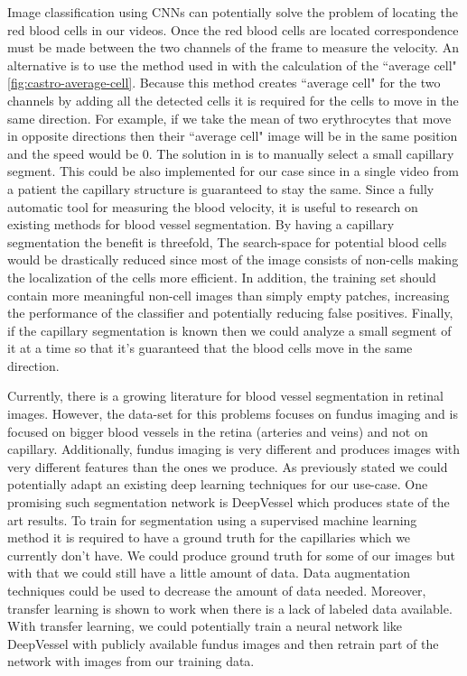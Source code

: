 \documentclass[]{article}
\begin{document}
Image classification using CNNs can potentially solve the problem of locating the red blood cells in our videos.
Once the red blood cells are located correspondence must be made between the two channels of the frame to measure the velocity.
An alternative is to use the method used in\cite{castro_rapid_2016} with the calculation 
of the ``average cell"\ref{fig:castro-average-cell}.
Because this method creates ``average cell" for the two channels by adding all the detected
cells it is required for the cells to move in the same direction. 
For example, if we take the mean of two erythrocytes that move in opposite directions then their ``average cell" image will be in the same position and the speed would be 0.
The solution in\cite{castro_rapid_2016} is to manually select a small capillary segment.
This could be also implemented for our case since in a single video from a patient 
the capillary structure is guaranteed to stay the same.
Since a fully automatic tool for measuring the blood velocity, it is useful
to research on existing methods for blood vessel segmentation.
By having a capillary segmentation the benefit is threefold,
The search-space for potential blood cells would be drastically reduced since
most of the image consists of non-cells making the localization of the cells more efficient.
In addition, the training set should contain more meaningful non-cell images than simply empty patches, increasing the performance of the classifier and potentially reducing false positives.
Finally, if the capillary segmentation is known then we could analyze a
small segment of it at a time so that it's guaranteed that the blood cells move 
in the same direction.

Currently, there is a growing literature for blood vessel segmentation 
in retinal images\cite{liskowski_segmenting_2016}\cite{fu_retinal_2016}\cite{li_cross-modality_2016}. 
However, the data-set for this problems focuses on fundus imaging\cite{fraz_blood_2012} and is focused on bigger blood vessels in the 
retina (arteries and veins) and not on capillary. 
Additionally, fundus imaging is very different and produces images with very different features than the ones we produce.
As previously stated we could potentially adapt an existing deep learning techniques for our use-case.
One promising such segmentation network is DeepVessel\cite{fu_deepvessel_2016} which produces state of the art results.
To train for segmentation using a supervised machine learning method it is required to have a ground truth for the capillaries which we currently don't
have.
We could produce ground truth  for some of our images but with that we could still
have a little amount of data.
Data augmentation techniques could be used to decrease the amount of data needed.
Moreover, transfer learning is shown to work\cite{jiang_retinal_2018} when 
there is a lack of labeled data available.
With transfer learning, we could potentially train a neural network like
DeepVessel with publicly available fundus images and then retrain part of 
the network with images from our training data.
\end{document}
